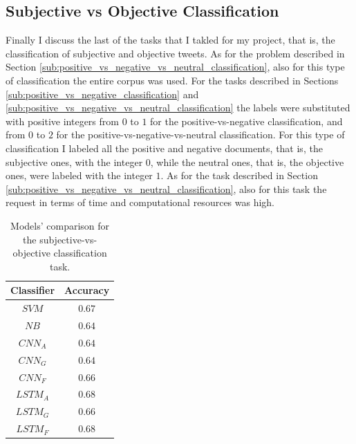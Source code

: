\documentclass[11pt,twocolumn]{article}
\begin{document}
        \subsection{Subjective vs Objective Classification} %
        \label{sub:subjective_vs_objective_classification}
            Finally I discuss the last of the tasks that I takled for my project, that is, the
            classification of subjective and objective tweets. As for the problem described in Section
            \ref{sub:positive_vs_negative_vs_neutral_classification}, also for this type of
            classification the entire corpus was used. For the tasks described in Sections
            \ref{sub:positive_vs_negative_classification} and
            \ref{sub:positive_vs_negative_vs_neutral_classification} the labels were substituted with
            positive integers from $0$ to $1$ for the positive-vs-negative classification, and from $0$ to
            $2$ for the positive-vs-negative-vs-neutral classification. For this type of classification I
            labeled all the positive and negative documents, that is, the subjective ones, with the integer
            $0$, while the neutral ones, that is, the objective ones, were labeled with the integer $1$.
            As for the task described in Section \ref{sub:positive_vs_negative_vs_neutral_classification},
            also for this task the request in terms of time and computational resources was high.

            \begin{table}[h]
                \centering
                \begin{tabular}{| c | c |}
                    \hline
                    \textbf{Classifier} & \textbf{Accuracy} \\
                    \hline
                    $SVM$ & $0.67$ \\
                    \hline
                    $NB$ & $0.64$ \\
                    \hline
                    $CNN_A$ & $0.64$ \\
                    \hline
                    $CNN_G$ & $0.64$ \\
                    \hline
                    $CNN_F$ & $0.66$ \\
                    \hline
                    $LSTM_A$ & $0.68$ \\
                    \hline
                    $LSTM_G$ & $0.66$ \\
                    \hline
                    $LSTM_F$ & $0.68$ \\
                    \hline
                \end{tabular}
                \caption{Models' comparison for the subjective-vs-objective classification task.}
                \label{tab:so_comparison}
            \end{table}
\end{document}
